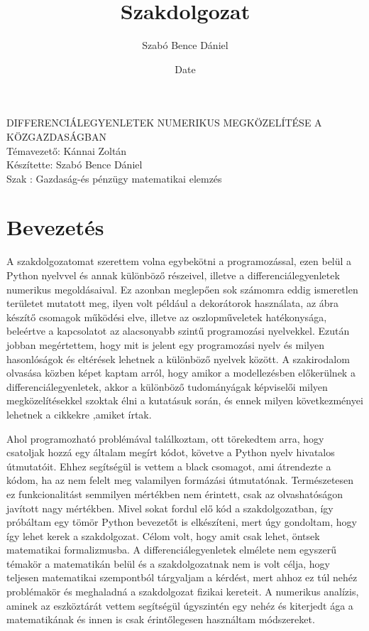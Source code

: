 \documentclass{article}
\title{Szakdolgozat}
\author{Szabó Bence Dániel }
\date{Date}
\theoremstyle{definition}
\theoremstyle{theorem}
\begin{document}
\begin{center}
\fontsize{40pt}{12pt}\selectfont

    DIFFERENCIÁLEGYENLETEK NUMERIKUS MEGKÖZELÍTÉSE A KÖZGAZDASÁGBAN\\
    \bigskip
    Témavezető: Kánnai Zoltán\\
    \bigskip
    Készítette: Szabó Bence Dániel\\
    \bigskip
    Szak : Gazdaság-és pénzügy matematikai elemzés
\end{center}

\pagebreak
\tableofcontents
\pagebreak
\section{Bevezetés}
A szakdolgozatomat szerettem volna egybekötni a programozással, ezen belül a Python nyelvvel és annak különböző részeivel, illetve a differenciálegyenletek numerikus megoldásaival. Ez azonban meglepően sok számomra eddig ismeretlen területet mutatott meg, ilyen volt például a dekorátorok használata, az ábra készítő csomagok működési elve, illetve az oszlopműveletek hatékonysága, beleértve a kapcsolatot az alacsonyabb szintű programozási nyelvekkel. Ezután jobban megértettem, hogy mit is jelent egy programozási nyelv és milyen hasonlóságok és eltérések lehetnek a különböző nyelvek között. A szakirodalom olvasása közben képet kaptam arról, hogy amikor a modellezésben előkerülnek a differenciálegyenletek, akkor a különböző tudományágak képviselői milyen megközelítésekkel szoktak élni a kutatásuk során, és ennek milyen következményei lehetnek a cikkekre ,amiket írtak.

Ahol programozható problémával találkoztam, ott törekedtem arra, hogy csatoljak hozzá egy általam megírt kódot, követve a Python nyelv hivatalos útmutatóit. Ehhez segítségül is vettem a black csomagot, ami átrendezte a kódom, ha az nem felelt meg valamilyen formázási útmutatónak. Természetesen ez funkcionalitást semmilyen mértékben nem érintett, csak az olvashatóságon javított nagy mértékben. Mivel sokat fordul elő kód a szakdolgozatban, így próbáltam egy tömör Python bevezetőt is elkészíteni, mert úgy gondoltam, hogy így lehet kerek a szakdolgozat. Célom volt,  hogy amit csak lehet, öntsek matematikai formalizmusba.  A differenciálegyenletek elmélete nem egyszerű témakör a matematikán belül és a szakdolgozatnak nem is volt célja, hogy teljesen matematikai szempontból tárgyaljam a kérdést, mert ahhoz ez túl nehéz problémakör és meghaladná  a szakdolgozat fizikai kereteit. A numerikus analízis, aminek az eszköztárát vettem segítségül úgyszintén egy nehéz és kiterjedt ága a matematikának és innen is csak érintőlegesen használtam módszereket.
\end{document}
